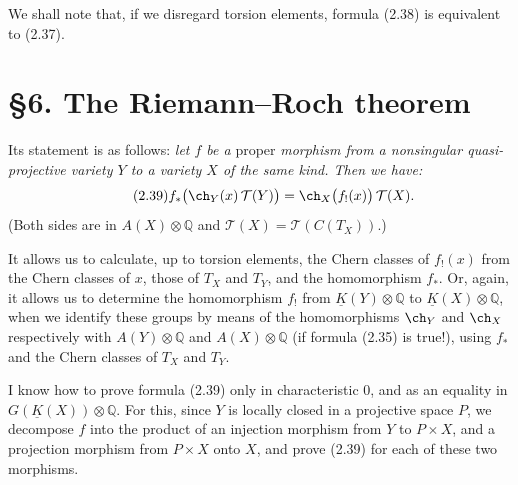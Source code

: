 We shall note that, if we disregard torsion elements, formula (2.38) is equivalent to (2.37).




\providecommand{\cS}{\mathcal S}
\providecommand{\cD}{\mathcal D}
\providecommand{\cE}{\mathscr E}
\providecommand{\cG}{\mathscr G}
\providecommand{\cL}{\mathscr L}
\providecommand{\cM}{\mathscr M}
\providecommand{\cP}{\mathscr P}
\providecommand{\cK}{\mathcal K}
\providecommand{\Db}{\mathrm D}
\providecommand{\Kb}{\mathrm K}
\providecommand{\Trc}{\operatorname{Tr}}
\providecommand{\ob}{\operatorname{ob}}
\providecommand{\Coh}{\operatorname{Coh}}
\providecommand{\Cone}{\operatorname{Cone}}
\providecommand{\im}{\operatorname{Im}}
\providecommand{\Id}{\operatorname{Id}}
\providecommand{\RR}{\mathrm{R.R.}}
\providecommand{\RRR}{\mathrm{R.R.R.}}
\providecommand{\GrR}{\mathrm{G}}
\providecommand{\pr}{\operatorname{pr}}


%
\section*{\S 6. The Riemann--Roch theorem}

Its statement is as follows: \emph{let \(f\) be a} proper \emph{morphism from a nonsingular quasi-projective variety \(Y\) to a variety \(X\) of the same kind. Then we have:}
\begin{equation}\tag{2.39}
 f_*\bigl(\ch_Y(x)\,\mathcal T(Y)\bigr)
 =
 \ch_X\bigl(f_!(x)\bigr)\,\mathcal T(X).
\end{equation}
(Both sides are in \(A(X)\otimes\mathbb Q\) and \(\mathcal T(X)=\mathcal T(C(T_X))\).)

It allows us to calculate, up to torsion elements, the Chern classes of \(f_!(x)\) from the Chern classes of \(x\), those of \(T_X\) and \(T_Y\), and the homomorphism \(f_*\). Or, again, it allows us to determine the homomorphism
\(f_!\) from \(\underline K(Y)\otimes\mathbb Q\) to \(\underline K(X)\otimes\mathbb Q\), when we identify these groups by means of the homomorphisms \(\ch_Y\) and \(\ch_X\) respectively with \(A(Y)\otimes\mathbb Q\) and \(A(X)\otimes\mathbb Q\) (if formula (2.35) is true!), using \(f_*\) and the Chern classes of \(T_X\) and \(T_Y\).

I know how to prove formula (2.39) only in characteristic \(0\), and as an equality in \(G(\underline K(X))\otimes\mathbb Q\). For this, since \(Y\) is locally closed in a projective space \(P\), we decompose \(f\) into the product of an injection morphism from \(Y\) to \(P\times X\), and a projection morphism from \(P\times X\) onto \(X\), and prove (2.39) for each of these two morphisms.

